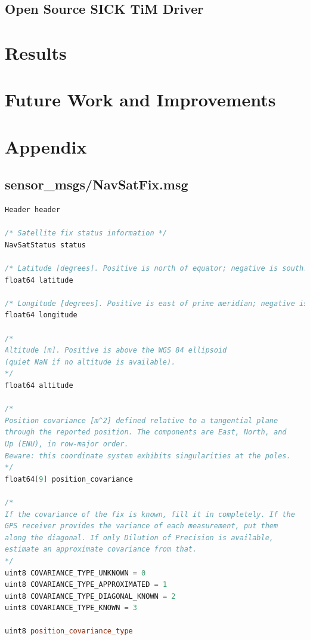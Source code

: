 \documentclass[titlepage,12pt,a4paper]{article}
\begin{document}
\subsection{Open Source SICK TiM Driver}

\pagebreak
\section{Results}

\pagebreak
\section{Future Work and Improvements}

\pagebreak
\section{Appendix}


\subsection{sensor\_msgs/NavSatFix.msg}
\begin{lstlisting}[language=C++]
Header header

/* Satellite fix status information */
NavSatStatus status

/* Latitude [degrees]. Positive is north of equator; negative is south. */
float64 latitude

/* Longitude [degrees]. Positive is east of prime meridian; negative is west. */
float64 longitude

/*
Altitude [m]. Positive is above the WGS 84 ellipsoid
(quiet NaN if no altitude is available).
*/
float64 altitude

/*
Position covariance [m^2] defined relative to a tangential plane
through the reported position. The components are East, North, and
Up (ENU), in row-major order.
Beware: this coordinate system exhibits singularities at the poles.
*/
float64[9] position_covariance

/*
If the covariance of the fix is known, fill it in completely. If the
GPS receiver provides the variance of each measurement, put them
along the diagonal. If only Dilution of Precision is available,
estimate an approximate covariance from that.
*/
uint8 COVARIANCE_TYPE_UNKNOWN = 0
uint8 COVARIANCE_TYPE_APPROXIMATED = 1
uint8 COVARIANCE_TYPE_DIAGONAL_KNOWN = 2
uint8 COVARIANCE_TYPE_KNOWN = 3

uint8 position_covariance_type
\end{lstlisting}
\end{document}
